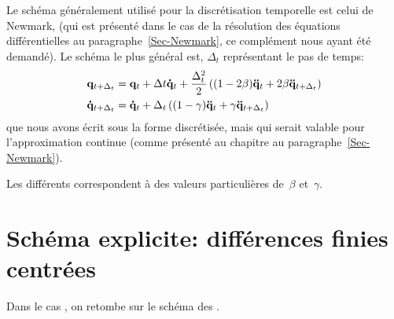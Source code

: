 \medskip
Le schéma généralement utilisé pour la discrétisation temporelle est celui de Newmark,
(qui est présenté dans le cas de la résolution des équations différentielles au paragraphe~\ref{Sec-Newmark},
ce complément nous ayant été demandé).
Le schéma le plus général est, $\Delta_t$ représentant le pas de temps:
\begin{equation}\colorblue
\begin{aligned}
&\VV{q}_{t+\Delta_t} = \VV{q}_t + \Delta t \VV{\dot q}_t + \frac{\Delta_t^2}2\left((1-2\beta)\VV{\ddot q}_t
+2\beta\VV{\ddot q}_{t+\Delta_t}\right) \\
&\VV{\dot q}_{t+\Delta_t} = \VV{\dot q}_t+\Delta_t\left((1-\gamma)\VV{\ddot q}_t+\gamma\VV{\ddot q}_{t+\Delta_t}
\right)
\end{aligned}
\end{equation}
que nous avons écrit sous la forme discrétisée, mais qui serait valable pour l'approximation
continue (comme présenté au chapitre au paragraphe~\ref{Sec-Newmark}).

Les différents 
correspondent à des valeurs particulières de~$\beta$ et~$\gamma$.



\bigskip
\section{Schéma explicite: différences finies centrées}

Dans le cas , on retombe sur le schéma des .

